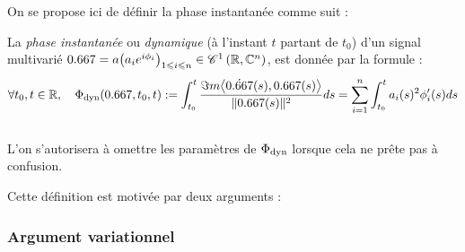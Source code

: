 On se propose ici de définir la phase instantanée comme suit :
\begin{definition} \label{def:phase_d}
	La \emph{phase instantanée} ou \emph{dynamique} (à l'instant $t$ partant de $t_0$) d'un signal multivarié $\x = a\big(a_ie^{i\phi_i}\big)_{1\leq i\leq n} \in \conti[1]{\R}{\C^n}$, est donnée par la formule :
	\begin{equation} \label{eq:phase_d}
		\forall t_0, t\in\R, \quad \phased(\x, t_0,t) \defeq \int_{t_0}^t \frac{\Im m \big\langle \dot{\x}(s) , \x(s) \big\rangle}{\|\x(s)\|^2} ds =\sum_{i=1}^n \int_{t_0}^t a_i(s)^2 \phi_i'(s)ds
	\end{equation}
	\\
	L'on s'autorisera à omettre les paramètres de $\Phi_{\text{\normalfont dyn}}$ lorsque cela ne prête pas à confusion.
\end{definition}
\skipl

Cette définition est motivée par deux arguments :



\subsubsection*{Argument variationnel}

